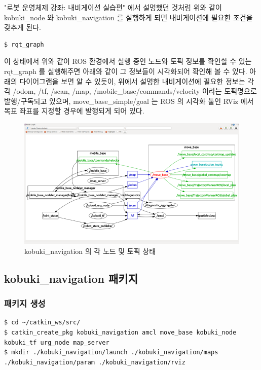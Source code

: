 "로봇 운영체제 강좌: 내비게이션 실습편" 에서 설명했던 것처럼 위와 같이 kobuki\_node 와 kobuki\_navigation 를 실행하게 되면 내비게이션에 필요한 조건을 갖추게 된다. 

\vspace{\baselineskip}
\begin{lstlisting}[language=ROS]
$ rqt_graph
\end{lstlisting}

이 상태에서 위와 같이 ROS 환경에서 실행 중인 노드와 토픽 정보를 확인할 수 있는 rqt\_graph 를 실행해주면 아래와 같이 그 정보들이 시각화되어 확인해 볼 수 있다. 아래의 다이어그램을 보면 알 수 있듯이, 위에서 설명한 내비게이션에 필요한 정보는 각각 /odom, /tf,  /scan, /map, /mobile\_base/commands/velocity 이라는 토픽명으로 발행/구독되고 있으며, move\_base\_simple/goal 는 ROS 의 시각화 툴인 RViz 에서 목표 좌표를 지정할 경우에 발행되게 되어 있다.

\begin{figure}[h]
\centering
\includegraphics[width=\columnwidth]{pictures/chapter11/navigation_qt_graph.png}
\caption{kobuki\_navigation 의 각 노드 및 토픽 상태}
\end{figure}

\subsection{kobuki\_navigation 패키지}

\subsubsection{패키지 생성}

\vspace{\baselineskip}
\begin{lstlisting}[language=ROS]
$ cd ~/catkin_ws/src/
$ catkin_create_pkg kobuki_navigation amcl move_base kobuki_node kobuki_tf urg_node map_server
$ mkdir ./kobuki_navigation/launch ./kobuki_navigation/maps ./kobuki_navigation/param ./kobuki_navigation/rviz
\end{lstlisting}

